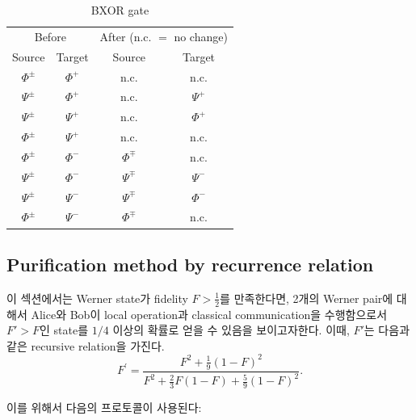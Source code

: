 \documentclass[
]{kaohandt}
\begin{document}
\begin{table}
\begin{tabular}{cccc}
    \multicolumn{2}{c}{ Before } & \multicolumn{2}{c}{ After (n.c. $=$ no change) } \\
    Source & Target & Source & Target \\
    \hline$\Phi^{ \pm}$ & $\Phi^{+}$ & n.c. & n.c. \\
    $\Psi^{ \pm}$ & $\Phi^{+}$ & n.c. & $\Psi^{+}$ \\
    $\Psi^{ \pm}$ & $\Psi^{+}$ & n.c. & $\Phi^{+}$ \\
    $\Phi^{ \pm}$ & $\Psi^{+}$ & n.c. & n.c. \\
    $\Phi^{ \pm}$ & $\Phi^{-}$ & $\Phi^{\mp}$ & n.c. \\
    $\Psi^{ \pm}$ & $\Phi^{-}$ & $\Psi^{\mp}$ & $\Psi^{-}$ \\
    $\Psi^{ \pm}$ & $\Psi^{-}$ & $\Psi^{\mp}$ & $\Phi^{-}$ \\
    $\Phi^{ \pm}$ & $\Psi^{-}$ & $\Phi^{\mp}$ & n.c.
\end{tabular}
\caption{BXOR gate}
\label{table:BXOR}
\end{table}


\subsection{Purification method by recurrence relation}
이 섹션에서는 Werner state가 fidelity $F > \frac{1}{2}$를 만족한다면, 2개의 Werner pair에 대해서 Alice와 Bob이 local operation과 classical communication을 수행함으로서 $F'>F$인 state를 $1/4$ 이상의 확률로 얻을 수 있음을 보이고자한다. 이때, $F'$는 다음과 같은 recursive relation을 가진다.
\begin{equation}
    F^{\prime}=\frac{F^2+\frac{1}{9}(1-F)^2}{F^2+\frac{2}{3} F(1-F)+\frac{5}{9}(1-F)^2} .
\end{equation}

이를 위해서 다음의 프로토콜이 사용된다:
\end{document}
